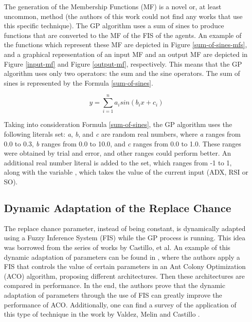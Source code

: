 The generation of the Membership Functions (MF) is a novel or, at least uncommon, method (the authors of this work could not find any works that use this specific technique). The GP algorithm uses a sum of sines to produce functions that are converted to the MF of the FIS of the agents. An example of the functions which represent these MF are depicted in Figure \ref{sum-of-sines-mfs}, and a graphical representation of an input MF and an output MF are depicted in Figure \ref{input-mf} and Figure \ref{output-mf}, respectively. This means that the GP algorithm uses only two operators: the sum and the sine operators. The sum of sines is represented by the Formula \ref{sum-of-sines}.

\begin{equation} \label{sum-of-sines}
  y = \sum_{i=1}^{n} a_{i} sin(b_{i}x + c_{i})
\end{equation}

Taking into consideration Formula \ref{sum-of-sines}, the GP algorithm uses the following literals set: \textit{a}, \textit{b}, and \textit{c} are random real numbers, where \textit{a} ranges from 0.0 to 0.3, \textit{b} ranges from 0.0 to 10.0, and \textit{c} ranges from 0.0 to 1.0. These ranges were obtained by trial and error, and other ranges could perform better. An additional real number literal is added to the set, which ranges from -1 to 1, along with the variable , which takes the value of the current input (ADX, RSI or SO).

\subsection{Dynamic Adaptation of the Replace Chance}
\label{dynamic-adaptation-of-the-replace-chance}

The replace chance parameter, instead of being constant, is dynamically adapted using a Fuzzy Inference System (FIS) while the GP process is running. This idea was borrowed from the series of works by Castillo, et al. An example of this dynamic adaptation of parameters can be found in \cite{castillo2015new}, where the authors apply a FIS that controls the value of certain parameters in an Ant Colony Optimization (ACO) algorithm, proposing different architectures. Then these architectures are compared in performance. In the end, the authors prove that the dynamic adaptation of parameters through the use of FIS can greatly improve the performance of ACO. Additionally, one can find a survey of the application of this type of technique in the work by Valdez, Melin and Castillo \cite{valdez2014survey}.

